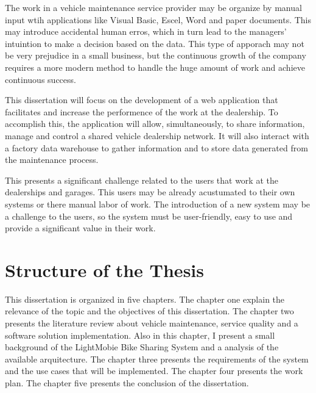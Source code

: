 The work in a vehicle maintenance service provider may be organize by manual input wtih applications like Visual Basic, Escel, Word and paper documents. \cite{MARS_MOTORS} 
This may introduce accidental human erros, which in turn lead to the managers' intuintion to make a decision based on the data. \cite{MARS_MOTORS}
This type of apporach may not be very prejudice in a small business, but the continuous growth of the company requires a more modern method to handle the huge amount of work and achieve continuous success. \cite{MARS_MOTORS}

This dissertation will focus on the development of a web application that facilitates and increase the performence of the work at the dealership.
To accomplish this, the application will allow, simultaneously, to share information, manage and control a shared vehicle dealership network.
It will also interact with a factory data warehouse to gather information and to store data generated from the maintenance process. 

This presents a significant challenge related to the users that work at the dealerships and garages. 
This users may be already acustumated to their own systems or there manual labor of work.  
The introduction of a new system may be a challenge to the users, so the system must be user-friendly, easy to use and provide a significant value in their work.

\section{Structure of the Thesis}

This dissertation is organized in five chapters. The chapter one explain the relevance of the topic and the objectives of this dissertation.
The chapter two presents the literature review about vehicle maintenance, service quality and a software solution implementation. 
Also in this chapter, I present a small background of the LightMobie Bike Sharing System and a analysis of the available arquitecture.
The chapter three presents the requirements of the system and the use cases that will be implemented.
The chapter four presents the work plan.
The chapter five presents the conclusion of the dissertation. 

